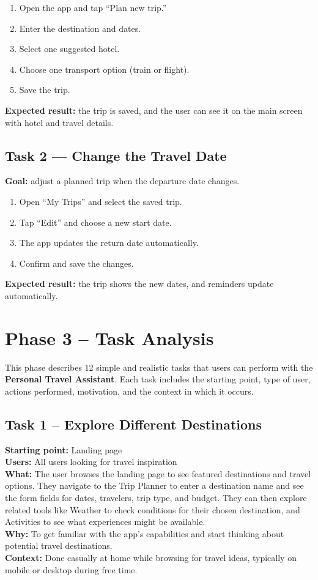\documentclass[11pt,a4paper]{article}
\begin{document}
\begin{enumerate}
  \item Open the app and tap “Plan new trip.”
  \item Enter the destination and dates.
  \item Select one suggested hotel.
  \item Choose one transport option (train or flight).
  \item Save the trip.
\end{enumerate}

\textbf{Expected result:} the trip is saved, and the user can see it on the main screen with hotel and travel details.

\subsection{Task 2 — Change the Travel Date}
\textbf{Goal:} adjust a planned trip when the departure date changes.

\begin{enumerate}
  \item Open “My Trips” and select the saved trip.
  \item Tap “Edit” and choose a new start date.
  \item The app updates the return date automatically.
  \item Confirm and save the changes.
\end{enumerate}

\textbf{Expected result:} the trip shows the new dates, and reminders update automatically.

\newpage
{}
\section*{Phase 3 – Task Analysis}

This phase describes 12 simple and realistic tasks that users can perform with the \textbf{Personal Travel Assistant}.  
Each task includes the starting point, type of user, actions performed, motivation, and the context in which it occurs.

\subsection*{Task 1 – Explore Different Destinations}
\textbf{Starting point:} Landing page \\
\textbf{Users:} All users looking for travel inspiration \\
\textbf{What:} The user browses the landing page to see featured destinations and travel options. They navigate to the Trip Planner to enter a destination name and see the form fields for dates, travelers, trip type, and budget. They can then explore related tools like Weather to check conditions for their chosen destination, and Activities to see what experiences might be available. \\
\textbf{Why:} To get familiar with the app's capabilities and start thinking about potential travel destinations. \\
\textbf{Context:} Done casually at home while browsing for travel ideas, typically on mobile or desktop during free time.
\end{document}
